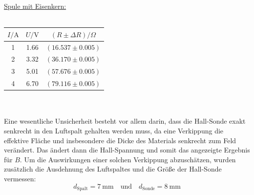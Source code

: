\documentclass[german,  %
parskip=full,  %
]{scrartcl}
\begin{document}
\begin{minipage}{0.45\textwidth}
\underline{Spule mit Eisenkern:} \\\\
\begin{tabular}{|c|c|c|}
\hline
\(I/ \mathrm{A}\) & \(U / \mathrm{V}\) & \((R \pm \Delta R )/ \Omega\)  \\\hline
1 & 1.66 & \((16.537 \pm 0.005)\) \\\hline
2 & 3.32 & \((36.170 \pm 0.005)\) \\\hline
3 & 5.01 & \((57.676 \pm 0.005)\) \\\hline
4 & 6.70 & \((79.116 \pm 0.005)\) \\\hline
\end{tabular}
\end{minipage} \\\\
Eine wesentliche Unsicherheit besteht vor allem darin, dass die Hall-Sonde exakt senkrecht in den Luftspalt gehalten werden muss, da eine Verkippung die effektive Fläche und insbesondere die Dicke des Materials senkrecht zum Feld verändert. Das ändert dann die Hall-Spannung und somit das angezeigte Ergebnis für \(B\). Um die Auswirkungen einer solchen Verkippung abzuschätzen, wurden zusätzlich die Ausdehnung des Luftspaltes und die Größe der Hall-Sonde vermessen:
\[d_{\mathrm{Spalt}} = 7 \ \mathrm{mm} \quad\text{und}\quad d_{\mathrm{Sonde}} = 8 \ \mathrm{mm}\]
\end{document}
